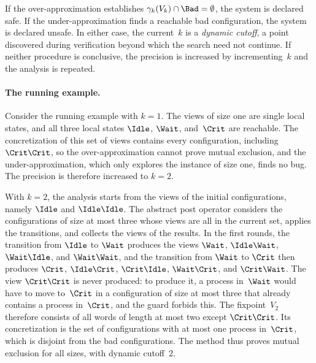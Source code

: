 If the over-approximation establishes $\gamma_k(V_k) \cap \Bad = \emptyset$,
the system is declared safe. If the under-approximation finds a reachable bad
configuration, the system is declared unsafe. In either case, the current~$k$
is a \emph{dynamic cutoff}, a point discovered during verification beyond
which the search need not continue. If neither procedure is conclusive, the
precision is increased by incrementing~$k$ and the analysis is repeated.

\paragraph{The running example.}
Consider the running example with $k = 1$. The views of size one are single
local states, and all three local states $\Idle$, $\Wait$, and~$\Crit$ are
reachable. The concretization of this set of views contains every
configuration, including $\Crit\Crit$, so the over-approximation cannot prove
mutual exclusion, and the under-approximation, which only explores the
instance of size one, finds no bug. The precision is therefore increased to $k
= 2$.

With $k = 2$, the analysis starts from the views of the initial
configurations, namely $\Idle$ and $\Idle\Idle$. The abstract post operator
considers the configurations of size at most three whose views are all in the
current set, applies the transitions, and collects the views of the results.
In the first rounds, the transition from $\Idle$ to $\Wait$ produces the views
$\Wait$, $\Idle\Wait$, $\Wait\Idle$, and $\Wait\Wait$, and the transition from
$\Wait$ to $\Crit$ then produces $\Crit$, $\Idle\Crit$, $\Crit\Idle$,
$\Wait\Crit$, and $\Crit\Wait$. The view $\Crit\Crit$ is never produced: to
produce it, a process in~$\Wait$ would have to move to~$\Crit$ in a
configuration of size at most three that already contains a process
in~$\Crit$, and the guard forbids this. The fixpoint~$V_2$ therefore consists
of all words of length at most two except $\Crit\Crit$. Its concretization is
the set of configurations with at most one process in~$\Crit$, which is
disjoint from the bad configurations. The method thus proves mutual exclusion
for all sizes, with dynamic cutoff~$2$.

